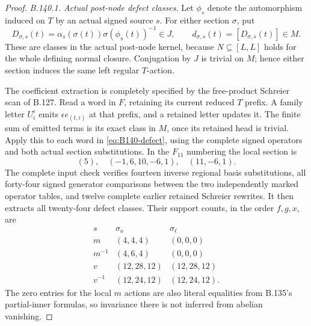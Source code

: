 \begin{proof}
\emph{B.140.1. Actual post-node defect classes.}
Let $\phi_s$ denote the automorphism induced on $T$ by an
actual signed source $s$. For either section $\sigma$, put
\begin{equation}\label{eq:B140-defect}
 D_{\sigma,s}(t)
   =\alpha_s(\sigma(t))\sigma(\phi_s(t))^{-1}\in J,\qquad
 d_{\sigma,s}(t)=[D_{\sigma,s}(t)]\in M .
\end{equation}
These are classes in the actual post-node kernel, because
$N\subseteq[L,L]$ holds for the whole defining normal closure.
Conjugation by $J$ is trivial on $M$; hence either section
induces the same left regular $T$-action.

The coefficient extraction is completely specified by the
free-product Schreier scan of B.127. Read a word in $F$,
retaining its current reduced $T$ prefix. A family letter
$U_i^\epsilon$ emits $\epsilon e_{(t,i)}$ at that prefix,
and a retained letter updates it. The finite sum of emitted
terms is its exact class in $M$, once its retained head is
trivial. Apply this to each word in \eqref{eq:B140-defect},
using the complete signed operators and both actual section
substitutions. In the $F_{11}$ numbering the local section is
\[
 (5),\quad(-1,6,10,-6,1),\quad(11,-6,1).
\]
The complete input check verifies fourteen inverse regional
basis substitutions, all forty-four signed generator
comparisons between the two independently marked operator
tables, and twelve complete earlier retained Schreier rewrites.
It then extracts all twenty-four defect classes.
Their support counts, in the order $f,g,x$, are
\begin{equation}\label{eq:B140-support-table}
 \begin{array}{c|c|c}
 s&\sigma_o&\sigma_\ell\\ \hline
 m&(4,4,4)&(0,0,0)\\
 m^{-1}&(4,6,4)&(0,0,0)\\
 v&(12,28,12)&(12,28,12)\\
 v^{-1}&(12,24,12)&(12,24,12).
 \end{array}
\end{equation}
The zero entries for the local $m$ actions are also literal
equalities from B.135's partial-inner formulas, so invariance
there is not inferred from abelian vanishing.


\end{proof}
